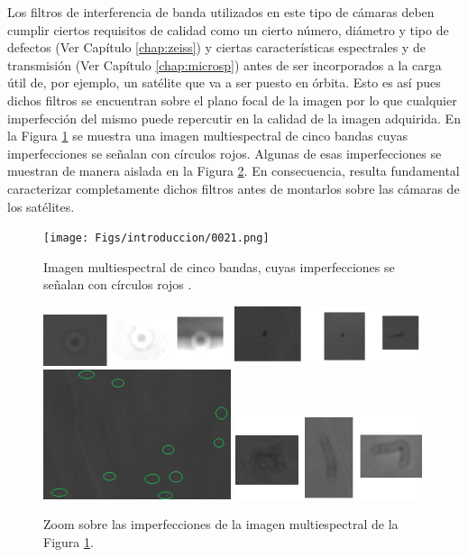  Los filtros de interferencia de banda 
utilizados en este tipo de cámaras deben cumplir ciertos requisitos de calidad como un cierto número, diámetro y tipo de defectos (Ver Capítulo \ref{chap:zeiss}) y ciertas características espectrales y de transmisión (Ver Capítulo \ref{chap:microsp}) antes de ser 
incorporados a la carga útil de, por ejemplo, un satélite que va a ser puesto 
en 
órbita. Esto es así pues dichos filtros se encuentran sobre el plano focal de la imagen por lo que cualquier imperfección del mismo puede repercutir en la calidad de la imagen adquirida. En la Figura \ref{fig:speus} se muestra una imagen multiespectral de cinco bandas cuyas imperfecciones se señalan con círculos rojos. Algunas de esas imperfecciones se muestran de manera aislada en la Figura \ref{fig:imgdefs}. En consecuencia, resulta fundamental caracterizar completamente dichos filtros antes de montarlos sobre las cámaras de los satélites.

\begin{figure}[H]
	\centering
	\texttt{[image: Figs/introduccion/0021.png]}
	\caption{Imagen multiespectral de cinco bandas, cuyas imperfecciones se señalan con círculos rojos .}
	\label{fig:speus}
\end{figure}

\begin{figure}[H]
\includegraphics[width=0.49\textwidth]{Figs/introduccion/agimgg.png}\hfill
\includegraphics[width=0.49\textwidth]{Figs/introduccion/manc.png}
\\[\smallskipamount]
\includegraphics[width=0.49\textwidth]{Figs/introduccion/agjj.png}\hfill
\includegraphics[width=0.49\textwidth]{Figs/introduccion/def2.png}
\caption{Zoom sobre las imperfecciones de la imagen multiespectral de la Figura \ref{fig:speus}.}
\label{fig:imgdefs}
\end{figure}

